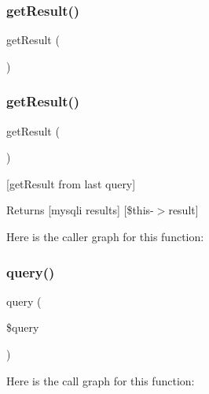 \subsubsection{\texorpdfstring{get\+Result()}{getResult()}\hspace{0.1cm}{\footnotesize\ttfamily [1/2]}}
{\footnotesize\ttfamily get\+Result (\begin{DoxyParamCaption}{ }\end{DoxyParamCaption})}

\mbox{\label{class_my_sql_conection_ae077eb8a032a325ceb939bfabfa5f472}} 
\subsubsection{\texorpdfstring{get\+Result()}{getResult()}\hspace{0.1cm}{\footnotesize\ttfamily [2/2]}}
{\footnotesize\ttfamily get\+Result (\begin{DoxyParamCaption}{ }\end{DoxyParamCaption})}

\mbox{[}get\+Result from last query\mbox{]} \begin{DoxyReturn}{Returns}
\mbox{[}mysqli results\mbox{]} \mbox{[}\$this-\/$>$result\mbox{]} 
\end{DoxyReturn}
Here is the caller graph for this function\+:
\mbox{\label{class_my_sql_conection_ac9fddec3f6bd1db128887a1b211d90f0}} 
\subsubsection{\texorpdfstring{query()}{query()}\hspace{0.1cm}{\footnotesize\ttfamily [1/2]}}
{\footnotesize\ttfamily query (\begin{DoxyParamCaption}\item[{}]{\$query }\end{DoxyParamCaption})}

Here is the call graph for this function\+:
\mbox{\label{class_my_sql_conection_ac9fddec3f6bd1db128887a1b211d90f0}} 
